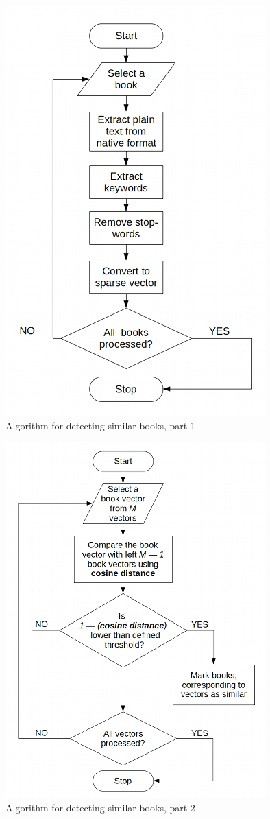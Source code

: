 \documentclass{article}
\begin{document}
\begin{figure}[htp]
\centering
\includegraphics[width=10cm]{SimilarityAlgPart1.png}
\caption{Algorithm for detecting similar books, part 1}
\label{fig:SimilarityAlg1}
\end{figure}

\begin{figure}[htp]
\centering
\includegraphics[width=10cm]{SimilarityAlgPart2.png}
\caption{Algorithm for detecting similar books, part 2}
\label{fig:SimilarityAlg2}
\end{figure}
\end{document}
